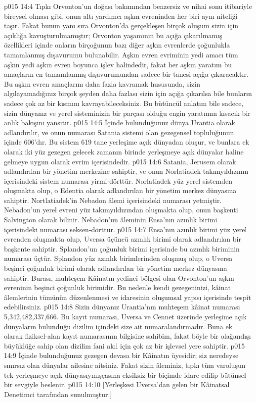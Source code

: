 \vs p015 14:4 Tıpkı Orvonton’un doğası bakımından benzersiz ve nihai sonu itibariyle bireysel olması gibi, onun altı yardımcı aşkın evreninden her biri aynı niteliği taşır. Fakat bunun yanı sıra Orvonton’da gerçekleşen birçok oluşum sizin için açıklığa kavuşturulmamıştır; Orvonton yaşamının bu açığa çıkarılmamış özellikleri içinde onların birçoğunun bazı diğer aşkın evrenlerde çoğunlukla tamamlanmış dışavurumu bulunabilir. Aşkın evren evriminin yedi amacı tüm aşkın yedi aşkın evren boyunca işlev halindedir, fakat her aşkın yaratım bu amaçların en tamamlanmış dışavurumundan sadece bir tanesi açığa çıkaracaktır. Bu aşkın evren amaçlarını daha fazla kavramak hususunda, sizin algılayamadığınız birçok şeyden daha fazlası sizin için açığa çıkarılsa bile bunların sadece çok az bir kısmını kavrayabileceksiniz. Bu bütüncül anlatım bile sadece, sizin dünyanız ve yerel sisteminizin bir parçası olduğu engin yaratımın kısacık bir anlık bakışını yansıtır.
\vs p015 14:5 İçinde bulunduğunuz dünya Urantia olarak adlandırılır, ve onun numarası Satania sistemi olan gezegensel topluluğunun içinde 606’dır. Bu sistem 619 tane yerleşime açık dünyadan oluşur, ve bunlara ek olarak iki yüz gezegen gelecek zamanın birinde yerleşmeye açık dünyalar haline gelmeye uygun olarak evrim içerisindedir.
\vs p015 14:6 Satania, Jerusem olarak adlandırılan bir yönetim merkezine sahiptir, ve onun Norlatiadek takımyıldızının içerisindeki sistem numarası yirmi\hyp{}dörttür. Norlatiadek yüz yerel sistemden oluşmakta olup, o Edentia olarak adlandırılan bir yönetim merkez dünyasına sahiptir. Nortlatiadek’in Nebadon âlemi içerisindeki numarası yetmiştir. Nebadon’un yerel evreni yüz takımyıldızından oluşmakta olup, onun başkenti Salvington olarak bilinir. Nebadon’un âleminin Ensa’nın azınlık birimi içerisindeki numarası seksen\hyp{}dörttür.
\vs p015 14:7 Ensa’nın azınlık birimi yüz yerel evrenden oluşmakta olup, Uversa üçüncü azınlık birimi olarak adlandırılan bir başkente sahiptir. Splandon’un çoğunluk birimi içerisinde bu azınlık biriminin numarası üçtür. Splandon yüz azınlık birimlerinden oluşmuş olup, o Uversa beşinci çoğunluk birimi olarak adlandırılan bir yönetim merkez dünyasına sahiptir. Burası, muhteşem Kâinatın yedinci bölgesi olan Orvonton’un aşkın evreninin beşinci çoğunluk birimidir. Bu nedenle kendi gezegeninizi, kâinat âlemlerinin tümünün düzenlenmesi ve idaresinin oluşumsal yapısı içerisinde tespit edebilirsiniz.
\vs p015 14:8 Sizin dünyanız Urantia’nın muhteşem kâinat numarası 5,342,482,337,666. Bu kayıt numarası, Uversa ve Cennet üzerinde yerleşime açık dünyaların bulunduğu dizilim içindeki size ait numaralandırmadır. Buna ek olarak fiziksel\hyp{}alan kayıt numarasının bilgisine sahibim, fakat böyle bir olağandışı büyüklüğe sahip olan dizilim fani akıl için çok az bir işlevsel yere sahiptir.
\vs p015 14:9 İçinde bulunduğunuz gezegen devasa bir Kâinatın üyesidir; siz neredeyse sınırsız olan dünyalar ailesine aitsiniz. Fakat sizin âleminiz, tıpkı tüm varoluşun tek yerleşmeye açık dünyasıymışçasına eksiksiz bir biçimde idare edilip bütünsel bir sevgiyle beslenir.
\vs p015 14:10 [Yerleşkesi Uversa’dan gelen bir Kâinatsal Denetimci tarafından sunulmuştur.]
